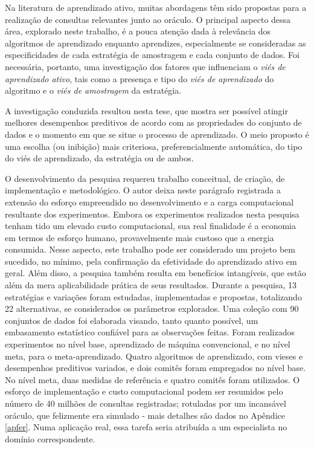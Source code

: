 Na literatura de aprendizado ativo, muitas abordagens têm sido propostas para a realização de consultas relevantes junto ao oráculo.
O principal aspecto dessa área, explorado neste trabalho, é a pouca atenção dada  
à relevância dos algoritmos de aprendizado enquanto aprendizes, especialmente se consideradas as especificidades de cada estratégia de amostragem e cada conjunto de dados.
Foi necessária, portanto, uma investigação dos fatores que influenciam o \textit{viés de aprendizado ativo}, tais como a presença e tipo do \textit{viés de aprendizado} do algoritmo e o \textit{viés de amostragem} da estratégia.

A investigação conduzida resultou nesta tese, que mostra ser possível atingir melhores desempenhos preditivos de acordo com as propriedades do conjunto de dados e o momento em que se situe o processo de aprendizado.
O meio proposto é uma escolha (ou inibição) mais criteriosa,
preferencialmente automática, do tipo do viés de aprendizado, da estratégia ou de ambos.

O desenvolvimento da pesquisa requereu trabalho conceitual, de criação, de implementação e metodológico.
O autor deixa neste parágrafo registrada a extensão do esforço empreendido no desenvolvimento e a carga computacional resultante dos experimentos.
Embora os experimentos realizados nesta pesquisa tenham tido um elevado custo computacional, sua real finalidade é a economia em termos de esforço humano, provavelmente mais custoso que a energia consumida.
Nesse aspecto, este trabalho pode ser considerado um projeto bem sucedido, no mínimo, pela confirmação da efetividade do aprendizado ativo em geral.
Além disso, a pesquisa também resulta em benefícios intangíveis, que estão além da mera aplicabilidade prática de seus resultados. Durante a pesquisa, 13 estratégias e variações foram estudadas, implementadas e propostas, totalizando 22 alternativas, se considerados os parâmetros explorados.
Uma coleção com 90 conjuntos de dados foi elaborada visando, tanto quanto possível, um embasamento estatístico confiável para as observações feitas.
Foram realizados experimentos no nível base, aprendizado de máquina convencional, e no nível meta, para o meta-aprendizado.
Quatro algoritmos de aprendizado, com vieses e desempenhos preditivos variados,
e dois comitês foram empregados no nível base.
No nível meta, duas medidas de referência e quatro comitês foram utilizados.
O esforço de implementação e custo computacional podem ser resumidos pelo número de 40 milhões de consultas registradas; rotuladas por um incansável oráculo, que felizmente era simulado - mais detalhes são dados no Apêndice \ref{apfer}. Numa aplicação real, essa tarefa seria atribuída a um especialista no domínio correspondente.

